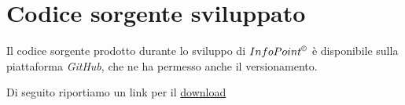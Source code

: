 \chapter{Codice sorgente sviluppato}
  Il codice sorgente prodotto durante lo sviluppo di $InfoPoint^{\copyright}$ è disponibile sulla piattaforma \emph{GitHub}, che ne ha permesso anche il versionamento.

  Di seguito riportiamo un link per il \href{https://github.com/luftmensch-luftmensch/InfoPoint/}{download}\footnotemark {}
